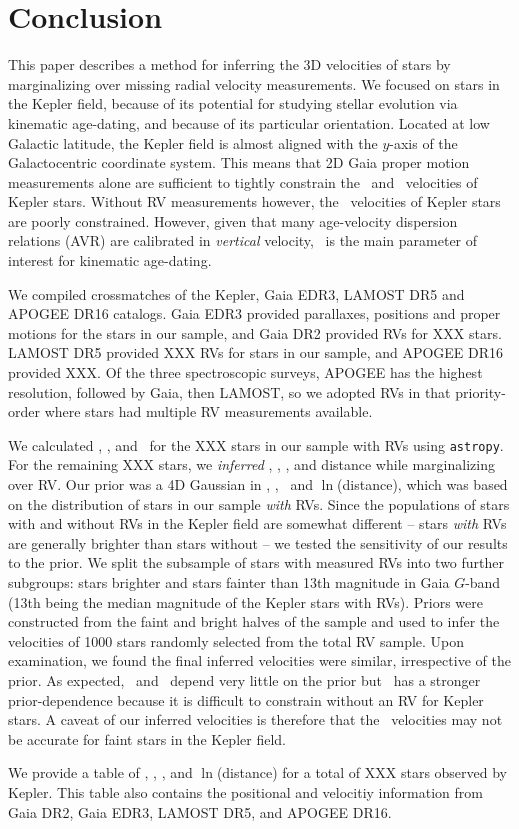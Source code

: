 \section{Conclusion}

This paper describes a method for inferring the 3D velocities of stars by
marginalizing over missing radial velocity measurements.
We focused on stars in the Kepler field, because of its potential for studying
stellar evolution via kinematic age-dating, and because of its particular
orientation.
Located at low Galactic latitude, the Kepler field is almost aligned with the
$y$-axis of the Galactocentric coordinate system.
This means that 2D Gaia proper motion measurements alone are sufficient to
tightly constrain the \vx\ and \vz\ velocities of Kepler stars.
Without RV measurements however, the \vy\ velocities  of Kepler stars are
poorly constrained.
However, given that many age-velocity dispersion relations (AVR) are
calibrated in {\it vertical} velocity, \vz\ is the main parameter of interest
for kinematic age-dating.

We compiled crossmatches of the Kepler, Gaia EDR3, LAMOST DR5 and APOGEE DR16
catalogs.
Gaia EDR3 provided parallaxes, positions and proper motions for the stars in
our sample, and Gaia DR2 provided RVs for XXX stars.
LAMOST DR5 provided XXX RVs for stars in our sample, and APOGEE DR16 provided
XXX.
Of the three spectroscopic surveys, APOGEE has the highest resolution,
followed by Gaia, then LAMOST, so we adopted RVs in that priority-order
where stars had multiple RV measurements available.

We calculated \vx, \vy, and \vz\ for the XXX stars in our sample with RVs
using {\tt astropy}.
For the remaining XXX stars, we {\it inferred} \vx, \vy, \vz, and distance
while marginalizing over RV.
Our prior was a 4D Gaussian in \vx, \vy, \vz\ and $\ln$(distance), which was
based on the distribution of stars in our sample {\it with} RVs.
Since the populations of stars with and without RVs in the Kepler field are
somewhat different -- stars {\it with} RVs are generally brighter than stars
without -- we tested the sensitivity of our results to the prior.
We split the subsample of stars with measured RVs into two further subgroups:
stars brighter and stars fainter than 13th magnitude in Gaia $G$-band (13th
being the median magnitude of the Kepler stars with RVs).
Priors were constructed from the faint and bright halves of the sample and
used to infer the velocities of 1000 stars randomly selected from the total RV
sample.
Upon examination, we found the final inferred velocities were similar,
irrespective of the prior.
As expected, \vx\ and \vz\ depend very little on the prior but \vy\ has a
stronger prior-dependence because it is difficult to constrain without an RV
for Kepler stars.
A caveat of our inferred velocities is therefore that the \vy\ velocities may
not be accurate for faint stars in the Kepler field.

We provide a table of \vx, \vy, \vz, and $\ln$(distance) for a total of XXX
stars observed by Kepler.
This table also contains the positional and velocitiy information from Gaia
DR2, Gaia EDR3, LAMOST DR5, and APOGEE DR16.
